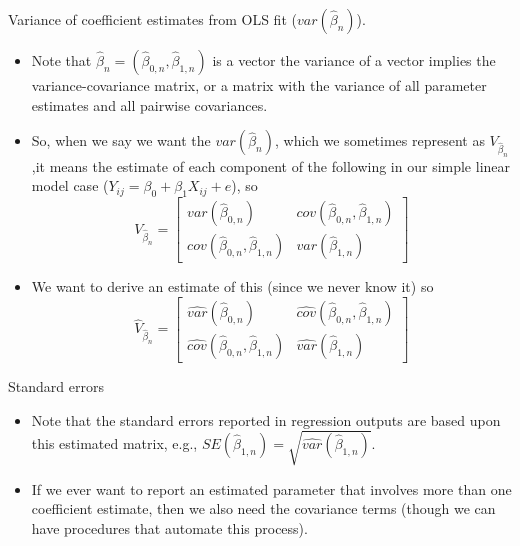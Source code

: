 \documentclass[ignorenonframetext,]{beamer}
\providecommand{\tightlist}{%
  \setlength{\itemsep}{0pt}\setlength{\parskip}{0pt}}
\begin{document}
\begin{frame}{Variance of coefficient estimates from OLS fit
(\(var(\hat{\beta}_n)\)).}

\begin{itemize}
\tightlist
\item
  Note that \(\hat{\beta}_n = (\hat{\beta}_{0,n}, \hat{\beta}_{1,n})\)
  is a vector the variance of a vector implies the variance-covariance
  matrix, or a matrix with the variance of all parameter estimates and
  all pairwise covariances.\\
\item
  So, when we say we want the \(var(\hat{\beta}_n)\), which we sometimes
  represent as \(V_{\hat{\beta}_n}\),it means the estimate of each
  component of the following in our simple linear model case
  (\(Y_{ij} = \beta_0+\beta_1 X_{ij}+e\)), so \[
  V_{\hat{\beta}_n} = 
  \begin{bmatrix}
  var(\hat{\beta}_{0,n})        & cov (\hat{\beta}_{0,n},\hat{\beta}_{1,n}) \\
  cov (\hat{\beta}_{0,n},\hat{\beta}_{1,n})   & var(\hat{\beta}_{1,n})
  \end{bmatrix}
  \]
\item
  We want to derive an estimate of this (since we never know it) so \[
  \hat{V}_{\hat{\beta}_n} = 
  \begin{bmatrix}
  \hat{var}(\hat{\beta}_{0,n})        & \hat{cov} (\hat{\beta}_{0,n},\hat{\beta}_{1,n}) \\
  \hat{cov} (\hat{\beta}_{0,n},\hat{\beta}_{1,n})   & \hat{var}(\hat{\beta}_{1,n})
  \end{bmatrix}
  \]
\end{itemize}

\end{frame}

\begin{frame}{Standard errors}

\begin{itemize}
\tightlist
\item
  Note that the standard errors reported in regression outputs are based
  upon this estimated matrix, e.g.,
  \(SE(\hat{\beta}_{1,n}) = \sqrt{\hat{var}(\hat{\beta}_{1,n})}\).
\item
  If we ever want to report an estimated parameter that involves more
  than one coefficient estimate, then we also need the covariance terms
  (though we can have procedures that automate this process).
\end{itemize}

\end{frame}
\end{document}
